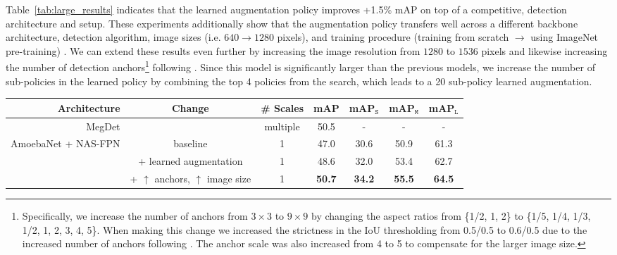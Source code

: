 \documentclass[10pt,twocolumn,letterpaper]{article}
\begin{document}
Table~\ref{tab:large_results} indicates that the learned augmentation policy improves
+1.5\% mAP on top of a competitive, detection architecture and setup. These experiments additionally show that the augmentation policy transfers well across a different backbone architecture, detection algorithm, image sizes (i.e. $640 \rightarrow 1280$ pixels), and training procedure (training from scratch $\rightarrow$ using ImageNet pre-training) .
We can extend these results even further by increasing the image resolution from $1280$ to $1536$ pixels and likewise increasing the number of detection anchors\footnote{Specifically, we increase the number of anchors from $3\times 3$ to $9 \times 9$ by changing the aspect ratios from \{1/2, 1, 2\} to \{1/5, 1/4, 1/3, 1/2, 1, 2, 3, 4, 5\}. When making this change we increased the strictness in the IoU thresholding from 0.5/0.5 to 0.6/0.5 due to the increased number of anchors following \cite{yang2018metaanchor}. The anchor scale was also increased from 4 to 5 to compensate for the larger image size.} following \cite{yang2018metaanchor}. Since this model is significantly larger than the previous models, we increase the number of sub-policies in the learned policy by combining the top 4 policies from the search, which leads to a 20 sub-policy learned augmentation. 


\begin{table*}[t]
\centering
\small
\begin{tabular}{r|c|c|c|ccc}
Architecture  & Change & \# Scales & mAP & mAP$_{\texttt S}$ & mAP$_{\texttt M}$ & mAP$_{\texttt L}$ \\
  \toprule
  MegDet \cite{Peng_2018_CVPR} & & multiple & 50.5 & - & - & - \\
  \hline
  \multirow{3}{*}{AmoebaNet + NAS-FPN}  & baseline \cite{ghiasi2019NASFpn} & 1 & 47.0 & 30.6 & 50.9 & 61.3 \\
   & + learned augmentation & 1 & 48.6 & 32.0 & 53.4 & 62.7 \\
   & + $\uparrow$ anchors, $\uparrow$ image size & 1 & \textbf{50.7} & \textbf{34.2} & \textbf{55.5} & \textbf{64.5} \\[0.1cm]
\end{tabular}
\caption{\textbf{Exceeding state-of-the-art detection with learned augmentation policy.} Reporting mAP for COCO validation set. Previous state-of-the-art results for COCO detection evaluated a single image at multiple spatial scales to perform detection at test time~\cite{Peng_2018_CVPR}. Our current results only require a single inference computation at single spatial scale.
Backbone model is AmoebaNet-D \cite{real2018regularized} and the NAS-FPN detection system \cite{ghiasi2019NASFpn}. For the \textbf{50.7} result, in addition to using the learned data augmentation policy, we increase the image size from 1280 to 1536 and the number of detection anchors from 3x3 to 9x9.}
\label{tab:large_results}  
\end{table*}
\end{document}
